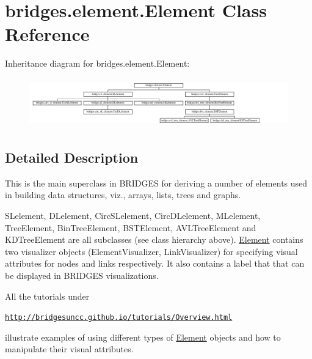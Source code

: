 \hypertarget{classbridges_1_1element_1_1_element}{}\section{bridges.\+element.\+Element Class Reference}
\label{classbridges_1_1element_1_1_element}
Inheritance diagram for bridges.\+element.\+Element\+:\begin{figure}[H]
\begin{center}
\leavevmode
\includegraphics[height=2.145594cm]{classbridges_1_1element_1_1_element}
\end{center}
\end{figure}


\subsection{Detailed Description}
This is the main superclass in B\+R\+I\+D\+G\+ES for deriving a number of elements used in building data structures, viz., arrays, lists, trees and graphs. 

S\+Lelement, D\+Lelement, Circ\+S\+Lelement, Circ\+D\+Lelement, M\+Lelement, Tree\+Element, Bin\+Tree\+Element, B\+S\+T\+Element, A\+V\+L\+Tree\+Element and K\+D\+Tree\+Element are all subclasses (see class hierarchy above). \hyperlink{classbridges_1_1element_1_1_element}{Element} contains two visualizer objects (Element\+Visualizer, Link\+Visualizer) for specifying visual attributes for nodes and links respectively. It also contains a label that that can be displayed in B\+R\+I\+D\+G\+ES visualizations.

All the tutorials under

\href{http://bridgesuncc.github.io/tutorials/Overview.html}{\tt http\+://bridgesuncc.\+github.\+io/tutorials/\+Overview.\+html}

illustrate examples of using different types of \hyperlink{classbridges_1_1element_1_1_element}{Element} objects and how to manipulate their visual attributes.

